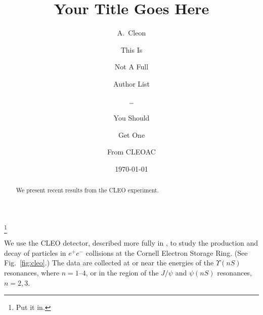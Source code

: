 \documentclass[aps,prd,preprint,superscriptaddress,tightenlines,nofootinbib]{revtex4}
\begin{document}

\title{Your Title Goes Here}


\author{A.~Cleon}

\author{This Is}
\author{Not A Full}
\author{Author List}
\author{\ldots}

\author{You Should}
\author{Get One}
\author{From CLEOAC}
\author{}
\thanks{Put it in.}

\noaffiliation


\date{\today}

\begin{abstract} 
We present recent results from the CLEO experiment.
\end{abstract}

\maketitle

We use the CLEO detector, described more fully in
\cite{Kubota:1992ww,Hill:1998ea}, to study the production and decay of
particles in $e^+e^-$ collisions at the Cornell Electron Storage Ring.
(See Fig.~\ref{fig:cleo}.)
The data are collected at or near the  energies of the $\Upsilon(nS)$
resonances, where $n=1$--$4$, or in the region of the $J/\psi$ and
$\psi(nS)$ resonances, $n=2,3$.
\end{document}
